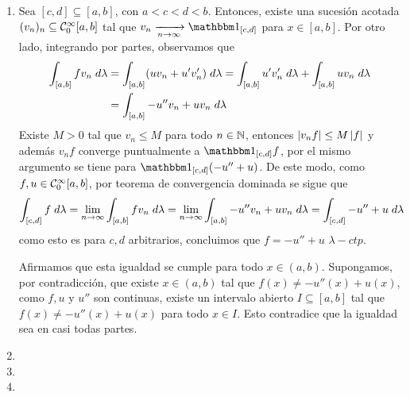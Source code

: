 \documentclass{article}
\begin{document}
\begin{enumerate}
    \item Sea $[c,d]\subseteq[a,b]$, con $a<c<d<b$. Entonces, existe una sucesión acotada 
    $(v_{n})_{n}\subseteq\mathcal{C}_{0}^{\infty}[a,b]$ tal que $v_{n}\xrightarrow[n\to\infty]{}
    \I_{[c,d]}$ para $x\in[a,b]$. Por otro lado, integrando por partes, observamos que
    \begin{align*}
        \int_{[a,b]}fv_{n}\hspace{1mm}d\lambda &= \int_{[a,b]}(uv_{n}+u'v_{n}')\hspace{1mm}d\lambda
        =\int_{[a,b]}u'v_{n}'\hspace{1mm}d\lambda+\int_{[a,b]}uv_{n}\hspace{1mm}d\lambda \\
        &= \int_{[a,b]}-u''v_{n}+uv_{n}\hspace{1mm}d\lambda
    \end{align*}
    Existe $M>0$ tal que $v_{n}\leq M$ para todo $n\in\mathbb{N}$, entonces $\left|v_{n}f \right|\leq M\left|f \right|$ y 
    además $v_{n}f$ converge puntualmente a $\I_{[c,d]}f$, por el mismo argumento se tiene para 
    $\I_{[c,d]}(-u''+u)$. De este modo, como $f,u\in\mathcal{C}_{0}^{\infty}[a,b]$, por teorema de 
    convergencia dominada se sigue que
    \begin{equation*}
        \int_{[c,d]}f\hspace{1mm}d\lambda=\lim\limits_{n\to\infty}
        \int_{[a,b]}fv_{n}\hspace{1mm}d\lambda=\lim\limits_{n\to\infty}
        \int_{[a,b]}-u''v_{n}+uv_{n}\hspace{1mm}d\lambda=\int_{[c,d]}-u''+u\hspace{1mm}d\lambda
    \end{equation*}
    como esto es para $c,d$ arbitrarios, concluimos que $f=-u''+u$ $\lambda-ctp$. 
    
    Afirmamos que esta igualdad se cumple para todo $x\in(a,b)$. Supongamos, por contradicción, que 
    existe $x\in(a,b)$ tal que $f(x)\neq-u''(x)+u(x)$, como $f,u$ y $u''$ son continuas, existe 
    un intervalo abierto $I\subseteq[a,b]$ tal que $f(x)\neq-u''(x)+u(x)$ para todo $x\in I$. Esto
    contradice que la igualdad sea en casi todas partes.

    \item 
    \item 
    \item 
\end{enumerate}

\end{document}
